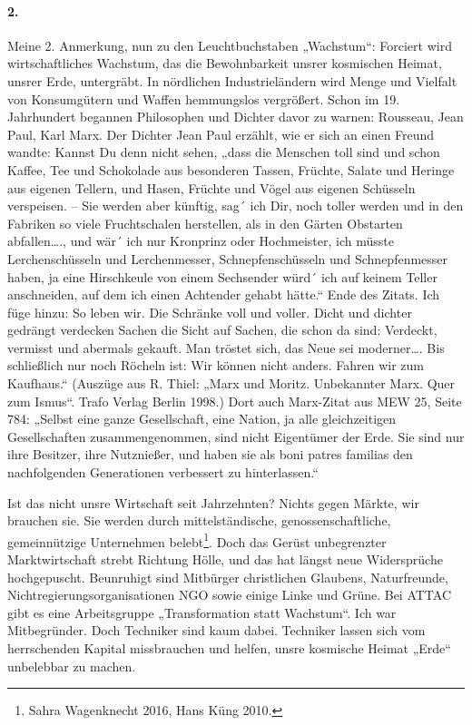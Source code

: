 \documentclass[12pt,a4paper]{article}
\begin{document}
\paragraph{2.}
Meine 2. Anmerkung, nun zu den Leuchtbuchstaben „Wachstum“: Forciert wird
wirtschaftliches Wachstum, das die Bewohnbarkeit unsrer kosmischen Heimat,
unsrer Erde, untergräbt. In nördlichen Industrieländern wird Menge und Vielfalt
von Konsumgütern und Waffen hemmungslos vergrößert. Schon im 19. Jahrhundert
begannen Philosophen und Dichter davor zu warnen: Rousseau, Jean Paul, Karl
Marx. Der Dichter Jean Paul erzählt, wie er sich an einen Freund wandte: Kannst
Du denn nicht sehen, „dass die Menschen toll sind und schon Kaffee, Tee und
Schokolade aus besonderen Tassen, Früchte, Salate und Heringe aus eigenen
Tellern, und Hasen, Früchte und Vögel aus eigenen Schüsseln verspeisen. – Sie
werden aber künftig, sag´ ich Dir, noch toller werden und in den Fabriken so
viele Fruchtschalen herstellen, als in den Gärten Obstarten abfallen…., und
wär´ ich nur Kronprinz oder Hochmeister, ich müsste Lerchenschüsseln und
Lerchenmesser, Schnepfenschüsseln und Schnepfenmesser haben, ja eine
Hirschkeule von einem Sechsender würd´ ich auf keinem Teller anschneiden, auf
dem ich einen Achtender gehabt hätte.“ Ende des Zitats. Ich füge hinzu: So
leben wir. Die Schränke voll und voller. Dicht und dichter gedrängt verdecken
Sachen die Sicht auf Sachen, die schon da sind: Verdeckt, vermisst und abermals
gekauft. Man tröstet sich, das Neue sei moderner…. Bis schließlich nur noch
Röcheln ist: Wir können nicht anders. Fahren wir zum Kaufhaus.“ (Auszüge aus
R. Thiel: „Marx und Moritz. Unbekannter Marx. Quer zum Ismus“. Trafo Verlag
Berlin 1998.) Dort auch Marx-Zitat aus MEW 25, Seite 784: „Selbst eine ganze
Gesellschaft, eine Nation, ja alle gleichzeitigen Gesellschaften
zusammengenommen, sind nicht Eigentümer der Erde. Sie sind nur ihre Besitzer,
ihre Nutznießer, und haben sie als boni patres familias den nachfolgenden
Generationen verbessert zu hinterlassen.“

Ist das nicht unsre Wirtschaft seit Jahrzehnten? Nichts gegen Märkte, wir
brauchen sie. Sie werden durch mittelständische, genossenschaftliche,
gemeinnützige Unternehmen belebt\footnote{Sahra Wagenknecht 2016, Hans Küng
  2010.}.  Doch das Gerüst unbegrenzter Marktwirtschaft strebt Richtung Hölle,
und das hat längst neue Widersprüche hochgepuscht. Beunruhigt sind Mitbürger
christlichen Glaubens, Naturfreunde, Nichtregierungsorganisationen NGO sowie
einige Linke und Grüne. Bei ATTAC gibt es eine Arbeitsgruppe „Transformation
statt Wachstum“. Ich war Mitbegründer. Doch Techniker sind kaum
dabei. Techniker lassen sich vom herrschenden Kapital missbrauchen und helfen,
unsre kosmische Heimat „Erde“ unbelebbar zu machen.
\end{document}

